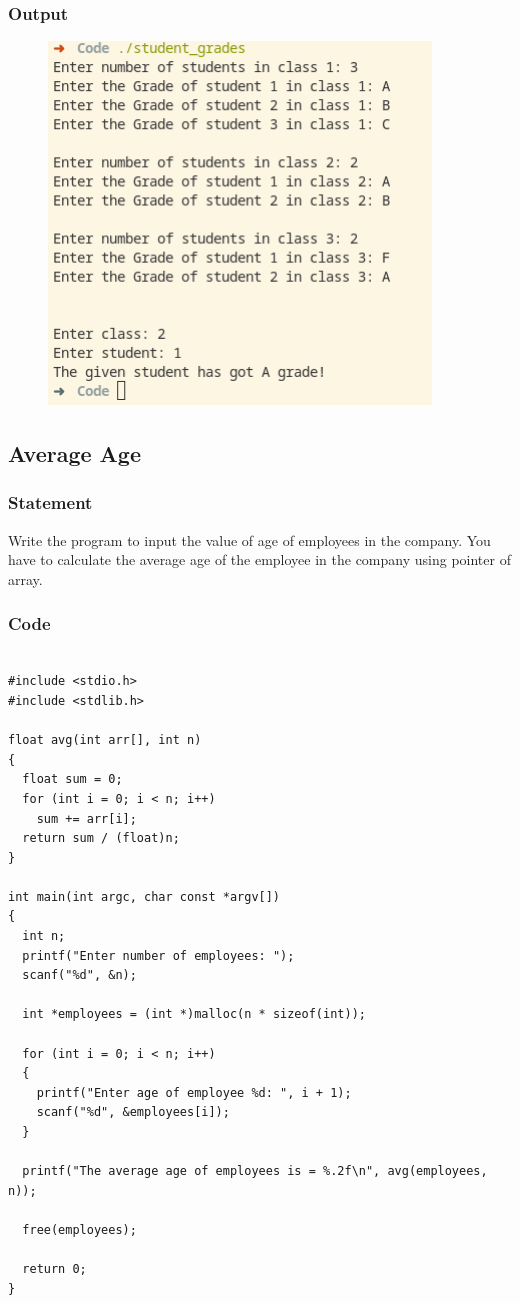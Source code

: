 \subsubsection{Output}
\begin{figure}[!htb]
  \centering
  \includegraphics[width=4in]{Images/1.png}
  \label{output:1}
\end{figure}

\pagebreak
\subsection{Average Age}

\subsubsection{Statement}
Write the program to input the value of age of employees in the company. You have to
calculate the average age of the employee in the company using pointer of array.

\subsubsection{Code}
\begin{verbatim} 

#include <stdio.h>
#include <stdlib.h>

float avg(int arr[], int n)
{
  float sum = 0;
  for (int i = 0; i < n; i++)
    sum += arr[i];
  return sum / (float)n;
}

int main(int argc, char const *argv[])
{
  int n;
  printf("Enter number of employees: ");
  scanf("%d", &n);

  int *employees = (int *)malloc(n * sizeof(int));

  for (int i = 0; i < n; i++)
  {
    printf("Enter age of employee %d: ", i + 1);
    scanf("%d", &employees[i]);
  }

  printf("The average age of employees is = %.2f\n", avg(employees, n));

  free(employees);

  return 0;
}

\end{verbatim}

